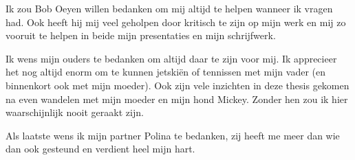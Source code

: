 Ik zou Bob Oeyen willen bedanken om mij altijd te helpen wanneer ik
vragen had. Ook heeft hij mij veel geholpen door kritisch te zijn op
mijn werk en mij zo vooruit te helpen in beide mijn presentaties en
mijn schrijfwerk.

Ik wens mijn ouders te bedanken om altijd daar te zijn voor mij.
Ik apprecieer het nog altijd enorm om te kunnen jetskiën of
tennissen met mijn vader (en binnenkort ook met mijn moeder).
Ook zijn vele inzichten in deze thesis gekomen na even wandelen
met mijn moeder en mijn hond Mickey.  Zonder hen zou ik hier
waarschijnlijk nooit geraakt zijn.

Als laatste wens ik mijn partner Polina te bedanken, zij heeft me
meer dan wie dan ook gesteund en verdient heel mijn hart.
\newpage
{\hypersetup{hidelinks}\tableofcontents} %
\newpage


